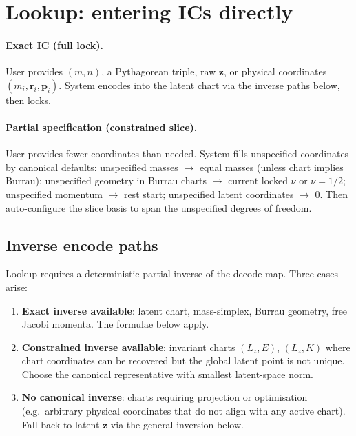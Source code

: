 \documentclass[11pt]{report}
\begin{document}
\section{Lookup: entering ICs directly}
\label{sec:lookup}

\paragraph{Exact IC (full lock).} User provides $(m,n)$, a Pythagorean triple, raw $\mathbf z$, or physical coordinates $(m_i,\mathbf r_i,\mathbf p_i)$. System encodes into the latent chart via the inverse paths below, then locks.

\paragraph{Partial specification (constrained slice).} User provides fewer coordinates than needed. System fills unspecified coordinates by canonical defaults: unspecified masses $\to$ equal masses (unless chart implies Burrau); unspecified geometry in Burrau charts $\to$ current locked $\nu$ or $\nu=1/2$; unspecified momentum $\to$ rest start; unspecified latent coordinates $\to$ 0. Then auto-configure the slice basis to span the unspecified degrees of freedom.

\subsection{Inverse encode paths}
\label{sec:inverse_encode}

Lookup requires a deterministic partial inverse of the decode map. Three cases arise:
\begin{enumerate}[nosep]
\item \textbf{Exact inverse available}: latent chart, mass-simplex, Burrau geometry, free Jacobi momenta. The formulae below apply.
\item \textbf{Constrained inverse available}: invariant charts $(L_z,E)$, $(L_z,K)$ where chart coordinates can be recovered but the global latent point is not unique. Choose the canonical representative with smallest latent-space norm.
\item \textbf{No canonical inverse}: charts requiring projection or optimisation (e.g.\ arbitrary physical coordinates that do not align with any active chart). Fall back to latent $\mathbf z$ via the general inversion below.
\end{enumerate}
\end{document}
